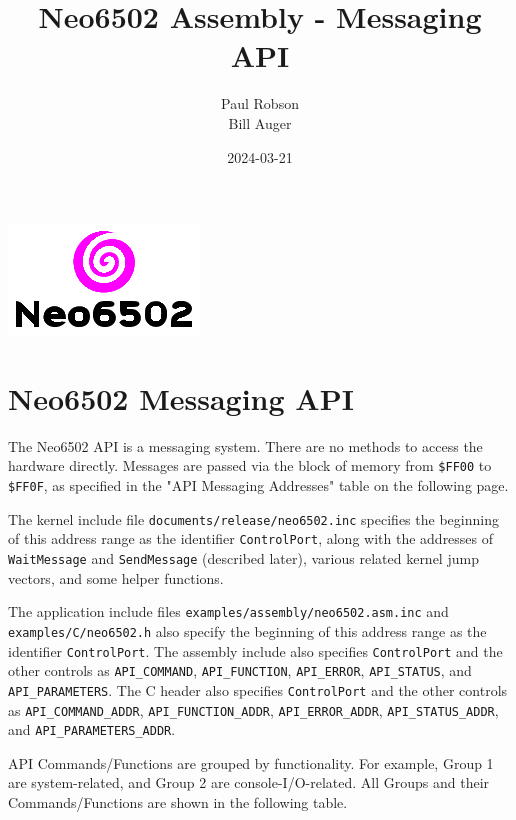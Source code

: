 \documentclass[12pt]{article}
\title{Neo6502 Assembly - Messaging API}
\author{Paul Robson \\ Bill Auger}
\date{2024-03-21}
\newcommand{\MonoSp}[1] {\fontsize{10pt}{10pt}\selectfont\texttt{#1}\normalsize}
\begin{document}
\maketitle

\begin{center}
  \includegraphics[scale=2.0]{neo6502-text-logo.png}
\end{center}

\tableofcontents


\pagebreak


\section{Neo6502 Messaging API}\label{api}

The Neo6502 API is a messaging system.
There are no methods to access the hardware directly.
Messages are passed via the block of memory from \MonoSp{\$FF00} to \MonoSp{\$FF0F},
as specified in the "API Messaging Addresses" table on the following page.
\newline

The kernel include file \MonoSp{documents/release/neo6502.inc}
specifies the beginning of this address range as the identifier \MonoSp{ControlPort},
along with the addresses of \MonoSp{WaitMessage} and \MonoSp{SendMessage} (described later),
various related kernel jump vectors, and some helper functions.
\newline

The application include files \MonoSp{examples/assembly/neo6502.asm.inc}
and \MonoSp{examples/C/neo6502.h}
also specify the beginning of this address range as the identifier \MonoSp{ControlPort}.
The assembly include also specifies \MonoSp{ControlPort} and the other controls as
\MonoSp{API\_COMMAND}, \MonoSp{API\_FUNCTION}, \MonoSp{API\_ERROR},
\MonoSp{API\_STATUS}, and \MonoSp{API\_PARAMETERS}.
The C header also specifies \MonoSp{ControlPort} and the other controls as
\MonoSp{API\_COMMAND\_ADDR}, \MonoSp{API\_FUNCTION\_ADDR},
\MonoSp{API\_ERROR\_ADDR}, \MonoSp{API\_STATUS\_ADDR},
and \MonoSp{API\_PARAMETERS\_ADDR}.
\newline

API Commands/Functions are grouped by functionality.
For example, Group 1 are system-related, and Group 2 are console-I/O-related.
All Groups and their Commands/Functions are shown in the following table.
\newline
\end{document}
